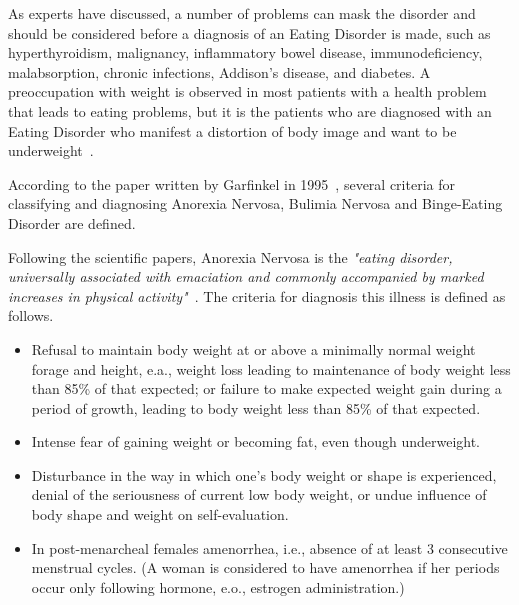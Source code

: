 
As experts have discussed, a number of problems can mask the disorder and should be considered before a diagnosis of an Eating Disorder is made, such as hyperthyroidism, malignancy, inflammatory bowel disease, immunodeficiency, malabsorption, chronic infections, Addison's disease, and diabetes. A preoccupation with weight is observed in most patients with a health problem that leads to eating problems, but it is the patients who are diagnosed with an Eating Disorder who manifest a distortion of body image and want to be underweight~\cite{pritts2003diagnosis}.

According to the paper written by Garfinkel in 1995~\cite{garfinkel1995views}, several criteria for classifying and diagnosing Anorexia Nervosa, Bulimia Nervosa and Binge-Eating Disorder are defined.


Following the scientific papers, Anorexia Nervosa is the \textit{"eating disorder, universally associated with emaciation and commonly accompanied by marked increases in physical activity"}~\cite{bulik2005anorexia}. The criteria for diagnosis this illness is defined as follows.
\begin{itemize}
    \item Refusal to maintain body weight at or above a minimally normal weight forage and height, e.a., weight loss leading to maintenance of body weight less than 85\% of that expected; or failure to make expected weight gain during a period of growth, leading to body weight less than 85\% of that expected.
    \item Intense fear of gaining weight or becoming fat, even though underweight.
    \item Disturbance in the way in which one's body weight or shape is experienced, denial of the seriousness of current low body weight, or undue influence of body shape and weight on self-evaluation.
    \item In post-menarcheal females amenorrhea, i.e., absence of at least 3 consecutive menstrual cycles. (A woman is considered to have amenorrhea if her periods occur only following hormone, e.o., estrogen administration.)
\end{itemize}


